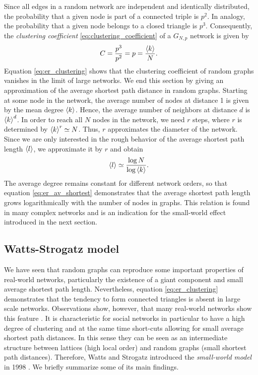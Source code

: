 \documentclass[openright,twoside,headsepline]{scrbook}
\begin{document}
Since all edges in a random network are independent and identically distributed, the probability that a given node is part of a connected triple is $p^2$.
In analogy, the probability that a given node belongs to a closed triangle is $p^3$.
Consequently, the \emph{clustering coefficient}  \eqref{eq:clustering_coefficient} of a $G_{N,p}$ network is given by
\begin{equation}\label{eq:er_clustering}
C=\frac{p^3}{p^2}=p=\frac{\left< k \right>}{N}.
\end{equation}
Equation \eqref{eq:er_clustering} shows that the clustering coefficient of random graphs vanishes in the limit of large networks.
We end this section by giving an approximation of the average shortest path distance in random graphs. 
Starting at some node in the network, the average number of nodes at distance 1 is given by the mean degree $\left< k \right>$. 
Hence, the average number of neighbors at distance $d$ is $\left< k \right>^d$.
In order to reach all $N$ nodes in the network, we need $r$ steps, where $r$ is determined by $\left< k \right>^r\simeq N$.
Thus, $r$ approximates the diameter of the network.
Since we are only interested in the rough behavior of the average shortest path length $\left< l \right>$, we approximate it by $r$ \citep{dynamical_processes} and obtain 
\begin{equation}\label{eq:er_av_shortest}
\left< l \right>\simeq \frac{\log N}{\log \left< k \right>}.
\end{equation}
The average degree remains constant for different network orders, so that equation \eqref{eq:er_av_shortest} demonstrates that the average shortest path length grows logarithmically with the number of nodes in \ER graphs.
This relation is found in many complex networks and is an indication for the small-world effect introduced in the next section.

\subsection{Watts-Strogatz model}\label{sec:watts_strogatz_model}
We have seen that random graphs can reproduce some important properties of real-world networks, particularly the existence of a giant component and small average shortest path length.
Nevertheless, equation \eqref{eq:er_clustering} demonstrates that the tendency to form connected triangles is absent in large scale \ER networks.
Observations show, however, that many real-world networks show this feature \citep{WassermanFaust,Newman2003,Milgram:1967}.
It is characteristic for social networks in particular to have a high degree of clustering and at the same time short-cuts allowing for small average shortest path distances.
In this sense they can be seen as an intermediate structure between lattices (high local order) and random graphs (small shortest path distances).
Therefore, Watts and Strogatz introduced the \emph{small-world model} in 1998 \citep{Watts:1998}.
We briefly summarize some of its main findings.
\end{document}
